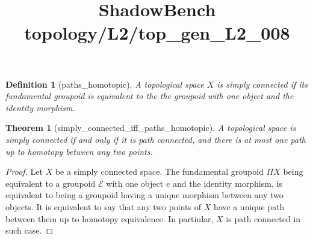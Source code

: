 \documentclass{article}
\title{ShadowBench topology/L2/top\_gen\_L2\_008}
\newtheorem{theorem}{Theorem}
\newtheorem{definition}{Definition}
\begin{document}
\maketitle

\begin{definition}[paths_homotopic]
A topological space $X$ is simply connected if its fundamental groupoid is equivalent to the the groupoid with one object and the identity morphism.
\end{definition}

\begin{theorem}[simply_connected_iff_paths_homotopic]
A topological space is simply connected if and only if it is path connected, and there is at most one path up to homotopy between any two points.
\end{theorem}
\begin{proof}
Let $X$ be a simply connected space. The fundamental groupoid $\Pi X$ being equivalent to a groupoid $\mathcal{E}$ with one object $e$ and the identity morphism, is equivalent to being a groupoid having a unique morphism between any two objects. It is equivalent to say that any two points of $X$ have a unique path between them up to homotopy equivalence. In partiular, $X$ is path connected in such case.
\end{proof}
\end{document}
